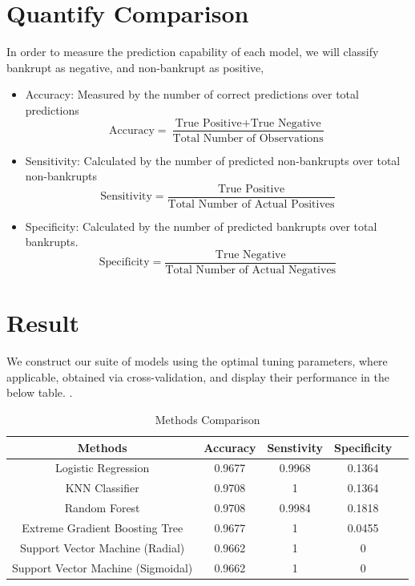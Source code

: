 \documentclass[12pt]{report}
\begin{document}
\section{Quantify Comparison}
In order to measure the prediction capability of each model, we will classify bankrupt as negative, and non-bankrupt as positive,
\begin{itemize}
    \item Accuracy: Measured by the number of correct predictions over total predictions
    \begin{equation}
        \text{Accuracy} = \frac{\text{True Positive} + \text{True Negative}}{\text{Total Number of Observations}}
    \end{equation}

    \item Sensitivity: Calculated by the number of predicted non-bankrupts over total non-bankrupts
    \begin{equation}
        \text{Sensitivity} = \frac{\text{True Positive}}{\text{Total Number of Actual Positives}}
    \end{equation}

    \item Specificity: Calculated by the number of predicted bankrupts over total bankrupts.
    \begin{equation}
        \text{Specificity} = \frac{\text{True Negative}}{\text{Total Number of Actual Negatives}}
    \end{equation}
\end{itemize}
\section{Result}

 We construct our suite of models using the optimal tuning parameters, where applicable, obtained via cross-validation, and display their performance in the below table. .

\begin{table}[ht]
\doublespacing
\centering
\caption{Methods Comparison}
\begin{tabular}{ccccc}
\label{modelcomp}
\textbf{Methods}          & \textbf{Accuracy} & \textbf{Senstivity} & \textbf{Specificity} \\ \hline
Logistic Regression       & 0.9677                  & 0.9968              & 0.1364              \\
KNN Classifier            & 0.9708                & 1             & 0.1364             \\
Random Forest             & 0.9708                  & 0.9984              & 0.1818              \\
Extreme Gradient Boosting Tree & 0.9677           & 1              & 0.0455\\
Support Vector Machine (Radial) & 0.9662           & 1              & 0             \\  
Support Vector Machine (Sigmoidal) & 0.9662           & 1             & 0
\end{tabular}

\end{table}
\end{document}
